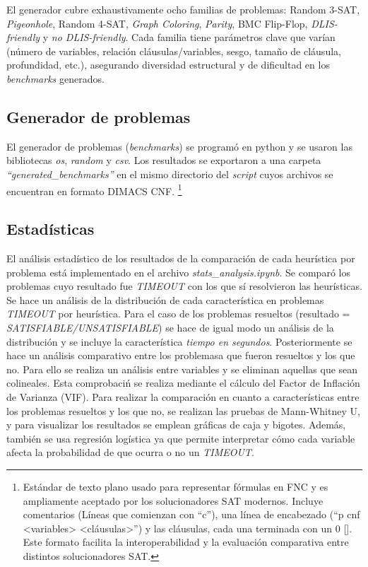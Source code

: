 El generador cubre exhaustivamente ocho familias de problemas: Random 3-SAT, \textit{Pigeonhole}, Random 4-SAT, \textit{Graph Coloring}, \textit{Parity}, BMC Flip-Flop, \textit{DLIS-friendly} y \textit{no DLIS-friendly}. Cada familia tiene parámetros clave que varían (número de variables, relación cláusulas/variables, sesgo, tamaño de cláusula, profundidad, etc.), asegurando diversidad estructural y de dificultad en los \textit{benchmarks} generados.

\subsection{Generador de problemas}
El generador de problemas (\textit{benchmarks}) se program\'o en python y se usaron las bibliotecas \textit{os}, \textit{random} y \textit{csv}. Los resultados se exportaron a una carpeta \textit{``generated\_benchmarks''} en el mismo directorio del \textit{script} cuyos archivos se encuentran en formato DIMACS CNF. \footnote{Est\'andar de texto plano usado para representar f\'ormulas en FNC y es ampliamente aceptado por los solucionadores SAT modernos. Incluye comentarios (L\'ineas que comienzan con ``c''), una l\'inea de encabezado (``p cnf <variables> <cláusulas>'') y las cl\'ausulas, cada una terminada con un 0 [\cite{varisat-dimacs}]. Este formato facilita la interoperabilidad y la evaluaci\'on comparativa entre distintos solucionadores SAT.} 

\subsection{Estad\'isticas}
El an\'alisis estad\'istico de los resultados de la comparaci\'on de cada heur\'istica por problema est\'a implementado en el archivo \textit{stats\_analysis.ipynb}. Se compar\'o los problemas cuyo resultado fue \textit{TIMEOUT} con los que s\'i resolvieron las heur\'isticas. Se hace un an\'alisis de la distribuci\'on de cada caracter\'istica en problemas \textit{TIMEOUT} por heur\'istica. Para el caso de los problemas resueltos (resultado = \textit{SATISFIABLE/UNSATISFIABLE}) se hace de igual modo un an\'alisis de la distribuci\'on y se incluye la caracter\'istica \textit{tiempo en segundos}. Posteriormente se hace un an\'alisis comparativo entre los problemasa que fueron resueltos y los que no. Para ello se realiza un an\'alisis entre variables y se eliminan aquellas que sean colineales. Esta comprobaci\'n se realiza mediante el c\'alculo del Factor de Inflaci\'on de Varianza (VIF).
Para realizar la comparaci\'on en cuanto a caracter\'isticas entre los problemas resueltos y los que no, se realizan las pruebas de Mann-Whitney U, y para visualizar los resultados se emplean gr\'aficas de caja y bigotes. Adem\'as, tambi\'en se usa regresi\'on log\'istica ya que permite interpretar c\'omo cada variable afecta la probabilidad de que ocurra o no un \textit{TIMEOUT}.

